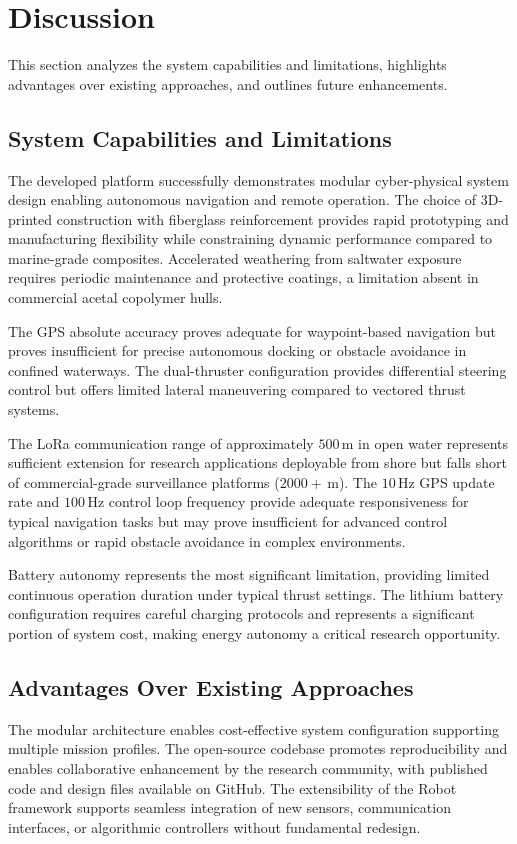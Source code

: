 \documentclass[conference]{IEEEtran}
\begin{document}
\section{Discussion}
\label{sec:discussion}
This section analyzes the system capabilities and limitations, highlights advantages over existing approaches, and outlines future enhancements.
\subsection{System Capabilities and Limitations}
The developed platform successfully demonstrates modular cyber-physical system design enabling autonomous navigation and remote operation. The choice of 3D-printed construction with fiberglass reinforcement provides rapid prototyping and manufacturing flexibility while constraining dynamic performance compared to marine-grade composites. Accelerated weathering from saltwater exposure requires periodic maintenance and protective coatings, a limitation absent in commercial acetal copolymer hulls.

The GPS absolute accuracy proves adequate for waypoint-based navigation but proves insufficient for precise autonomous docking or obstacle avoidance in confined waterways. The dual-thruster configuration provides differential steering control but offers limited lateral maneuvering compared to vectored thrust systems.

The LoRa communication range of approximately $500 \, \mathrm{m}$ in open water represents sufficient extension for research applications deployable from shore but falls short of commercial-grade surveillance platforms ($2000+ \, \mathrm{m}$). The $10 \, \mathrm{Hz}$ GPS update rate and $100 \, \mathrm{Hz}$ control loop frequency provide adequate responsiveness for typical navigation tasks but may prove insufficient for advanced control algorithms or rapid obstacle avoidance in complex environments.

Battery autonomy represents the most significant limitation, providing limited continuous operation duration under typical thrust settings. The lithium battery configuration requires careful charging protocols and represents a significant portion of system cost, making energy autonomy a critical research opportunity.

\subsection{Advantages Over Existing Approaches}
The modular architecture enables cost-effective system configuration supporting multiple mission profiles. The open-source codebase promotes reproducibility and enables collaborative enhancement by the research community, with published code and design files available on GitHub. The extensibility of the Robot framework supports seamless integration of new sensors, communication interfaces, or algorithmic controllers without fundamental redesign.
\end{document}
